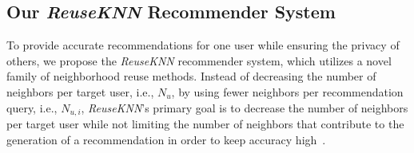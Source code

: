 \documentclass[manuscript,review,anonymous]{acmart}
\begin{document}

\subsection{Our \emph{ReuseKNN} Recommender System}
\label{subsec:reuseknn}
To provide accurate recommendations for one user while ensuring the privacy of others, we propose the \emph{ReuseKNN} recommender system, which utilizes a novel family of neighborhood reuse methods.
Instead of decreasing the number of neighbors per target user, i.e., $N_u$, by using fewer neighbors per recommendation query, i.e., $N_{u, i}$, \emph{ReuseKNN}'s primary goal is to decrease the number of neighbors per target user while not limiting the number of neighbors that contribute to the generation of a recommendation in order to keep accuracy high~\cite{herlocker1999algorithmic,herlocker2002empirical}.
\end{document}
